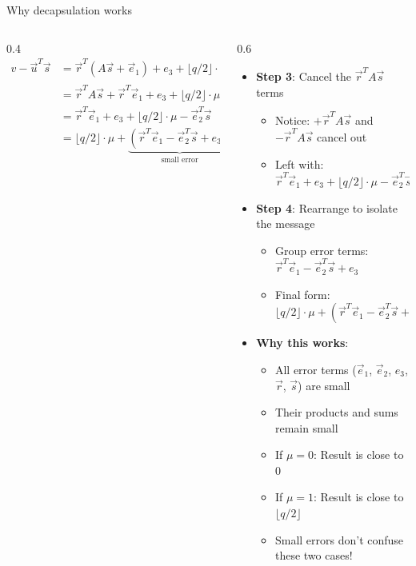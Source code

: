 \ifdefined\PRESENTATION\else\PassOptionsToClass{handout}{beamer}\fi\documentclass[aspectratio=169, lualatex]{beamer}
\begin{document}
\begin{frame}{Why decapsulation works}
	\begin{columns}[c]
		\begin{column}{0.4\textwidth}
			\tiny
			\begin{align*}
				v - \vec{u}^T\vec{s} & = \vec{r}^{T}(A\vec{s} + \vec{e}_1) + e_3 + \lfloor q/2 \rfloor \cdot \mu - (\vec{r}^{T}A + \vec{e}_{2}^{T})\vec{s}               \\
				                     & = \vec{r}^{T}A\vec{s} + \vec{r}^{T}\vec{e}_1 + e_3 + \lfloor q/2 \rfloor \cdot \mu - \vec{r}^{T}A\vec{s} - \vec{e}_{2}^{T}\vec{s} \\
				                     & = \vec{r}^{T}\vec{e}_{1} + e_3 + \lfloor q/2 \rfloor \cdot \mu - \vec{e}_{2}^{T}\vec{s}                                           \\
				                     & = \lfloor q/2 \rfloor \cdot \mu + \underbrace{(\vec{r}^{T}\vec{e}_{1} - \vec{e}_{2}^{T}\vec{s} + e_3)}_{\text{small error}}
			\end{align*}
		\end{column}
		\begin{column}{0.6\textwidth}
			\begin{itemize}
				\item \textbf{Step 3}: Cancel the $\vec{r}^TA\vec{s}$ terms
				      \begin{itemize}
					      \item Notice: $+\vec{r}^TA\vec{s}$ and $-\vec{r}^TA\vec{s}$ cancel out
					      \item Left with: $\vec{r}^T\vec{e}_1 + e_3 + \lfloor q/2 \rfloor \cdot \mu - \vec{e}_2^T\vec{s}$
				      \end{itemize}
				\item \textbf{Step 4}: Rearrange to isolate the message
				      \begin{itemize}
					      \item Group error terms: $\vec{r}^T\vec{e}_1 - \vec{e}_2^T\vec{s} + e_3$
					      \item Final form: $\lfloor q/2 \rfloor \cdot \mu + (\vec{r}^T\vec{e}_1 - \vec{e}_2^T\vec{s} + e_3)$
				      \end{itemize}
				\item \textbf{Why this works}:
				      \begin{itemize}
					      \item All error terms ($\vec{e}_1$, $\vec{e}_2$, $e_3$, $\vec{r}$, $\vec{s}$) are small
					      \item Their products and sums remain small
					      \item If $\mu = 0$: Result is close to 0
					      \item If $\mu = 1$: Result is close to $\lfloor q/2 \rfloor$
					      \item Small errors don't confuse these two cases!
				      \end{itemize}
			\end{itemize}
		\end{column}
	\end{columns}
\end{frame}
\end{document}
